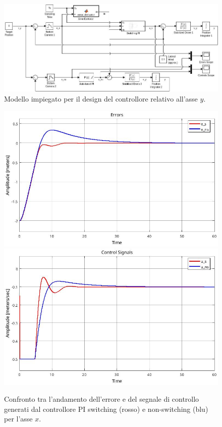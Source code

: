 \begin{figure}
    \centering
    \includegraphics[width=\textwidth]{figs/chapter4/compmodel.jpg}
    \caption{Modello impiegato per il design del controllore relativo all'asse $y$.}
    \label{fig:compmodel}
\end{figure}

\begin{figure}
    \centering
    \includegraphics[width=\textwidth]{figs/chapter4/xerrcomp.jpg}
    \vspace{0.2cm}
    \includegraphics[width=\textwidth]{figs/chapter4/xcontrolcomp.jpg}
    \caption{Confronto tra l'andamento dell'errore e del segnale di controllo generati dal controllore PI switching (rosso) e non-switching (blu) per l'asse $x$.}
    \label{fig:xcomp}
\end{figure}

